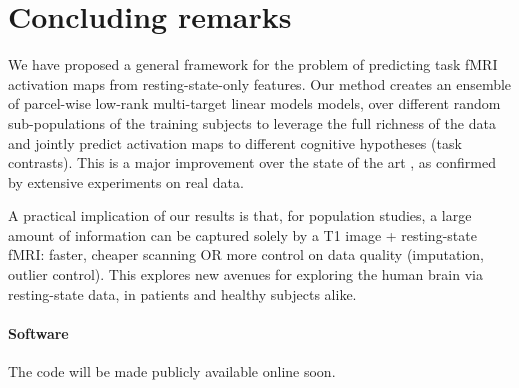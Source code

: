   
\section{Concluding remarks}
We have proposed a general framework for the problem of predicting task fMRI activation maps
from resting-state-only features. Our method creates an ensemble of parcel-wise low-rank multi-target
linear models models, over different random sub-populations of the training subjects to leverage
the full richness of the data and jointly predict activation maps to different cognitive hypotheses
(task contrasts). This is a major improvement over the state of the art \citep{tavor2016task},
as confirmed by extensive experiments on real data. 

A practical implication of our results is that, for population
studies, a large amount of information can be captured solely by a T1
image + resting-state fMRI: faster, cheaper scanning OR more control on data quality
(imputation, outlier control). This explores new avenues for exploring
the human brain via resting-state data, in patients and healthy subjects alike.
\paragraph{Software} The code will be made publicly available online soon.




